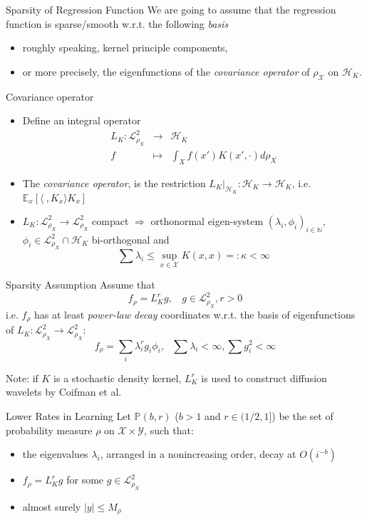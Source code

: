 \documentclass[pdf,slideColor,colorBG]{prosper}
\theoremstyle{theorem}
\theoremstyle{definition}
\theoremstyle{remark}
\def\<{{\langle}}
\def\>{{\rangle}}
\def\P{{\mathbb P}}        %
\def\E{{\mathbb E}}        %
\def\L{{\mathscr L}}
\def\L2{{\mathscr L}^2_{\rho_X}}
\def\M{M_\rho}
\def\H{{\mathscr H}}
\def\X{{\mathcal X}}
\def\Y{{\mathcal Y}}
\def\N{{\mathbb N}}
\def\la{{\lambda}}
\begin{document}
\begin{slide}{Sparsity of Regression Function}
We are going to assume that the regression function is sparse/smooth w.r.t. the following \emph{basis}
\begin{itemize}
    \item roughly speaking, kernel principle components,
    \item or more precisely, the eigenfunctions of the \emph{covariance operator} of $\rho_\X$ on $\H_K$.
\end{itemize}
\end{slide}
%
\begin{slide}{Covariance operator}
\begin{itemize}
    \item Define an integral operator
\[
\begin{array}{rcl}
L_K : \L2 & \to & \H_K \\
       f & \mapsto & \int_X f(x') K(x',\cdot) d \rho_X
\end{array}
\]
    \item The \emph{covariance operator}, is the restriction $L_K|_{\H_K}:\H_K\to \H_K$, i.e. $\E_x[ \<\ ,K_x\>K_x]$

    \item $L_K:\L2\to \L2$ compact $\Rightarrow$ orthonormal eigen-system $(\la_i,\phi_i)_{i\in \N}$, $\phi_i \in \L2\cap\H_K$ bi-orthogonal and
\[ \sum \la_i \leq \sup_{x\in \X} K(x,x) =: \kappa <\infty \]
\end{itemize}
\end{slide}

%
\begin{slide}{Sparsity Assumption}
Assume that
\[ f_\rho = L_K^r g, \ \ \ \ g\in \L2, r>0 \]
i.e. $f_\rho$ has at least \emph{power-law decay} coordinates w.r.t. the basis of eigenfunctions of $L_K:\L2\to \L2$:
\[ f_\rho = \sum_i \la_i^r g_i \phi_i,  \ \ \ \sum \la_i <\infty, \sum g_i^2 <\infty\]

\medskip
Note: if $K$ is a stochastic density kernel, $L_K^r$ is used to construct diffusion wavelets
by Coifman et al.
\end{slide}

\begin{slide}{Lower Rates in Learning}
Let $\P(b,r)$ ($b>1$ and $r\in (1/2,1]$) be the set of probability measure $\rho$ on $\X\times \Y$,
such that:
\begin{itemize}
    \item the eigenvalues $\la_i$, arranged in a nonincreasing order, decay at $O(i^{-b})$
    \item $f_\rho = L_K^{r} g$ for some $g \in \L2$
    \item almost surely $|y|\leq \M$
\end{itemize}
\end{slide}
\end{document}
